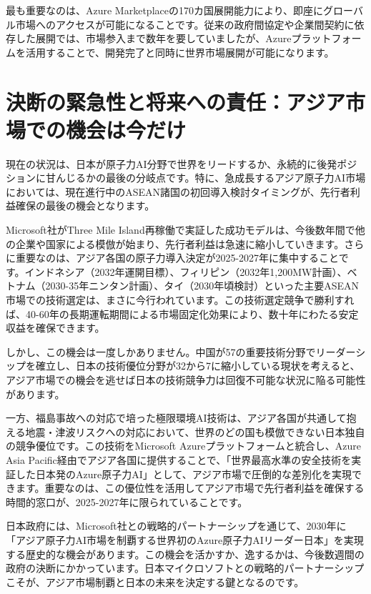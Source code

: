 \documentclass[10pt,a4paper]{jsarticle}
\begin{document}
最も重要なのは、Azure Marketplaceの170カ国展開能力により、即座にグローバル市場へのアクセスが可能になることです。従来の政府間協定や企業間契約に依存した展開では、市場参入まで数年を要していましたが、Azureプラットフォームを活用することで、開発完了と同時に世界市場展開が可能になります。

\section{決断の緊急性と将来への責任：アジア市場での機会は今だけ}

現在の状況は、日本が原子力AI分野で世界をリードするか、永続的に後発ポジションに甘んじるかの最後の分岐点です。特に、急成長するアジア原子力AI市場においては、現在進行中のASEAN諸国の初回導入検討タイミングが、先行者利益確保の最後の機会となります。

Microsoft社がThree Mile Island再稼働で実証した成功モデルは、今後数年間で他の企業や国家による模倣が始まり、先行者利益は急速に縮小していきます。さらに重要なのは、アジア各国の原子力導入決定が2025-2027年に集中することです。インドネシア（2032年運開目標）、フィリピン（2032年1,200MW計画）、ベトナム（2030-35年ニンタン計画）、タイ（2030年頃検討）といった主要ASEAN市場での技術選定は、まさに今行われています。この技術選定競争で勝利すれば、40-60年の長期運転期間による市場固定化効果により、数十年にわたる安定収益を確保できます。

しかし、この機会は一度しかありません。中国が57の重要技術分野でリーダーシップを確立し、日本の技術優位分野が32から7に縮小している現状を考えると、アジア市場での機会を逃せば日本の技術競争力は回復不可能な状況に陥る可能性があります。

一方、福島事故への対応で培った極限環境AI技術は、アジア各国が共通して抱える地震・津波リスクへの対応において、世界のどの国も模倣できない日本独自の競争優位です。この技術をMicrosoft Azureプラットフォームと統合し、Azure Asia Pacific経由でアジア各国に提供することで、「世界最高水準の安全技術を実証した日本発のAzure原子力AI」として、アジア市場で圧倒的な差別化を実現できます。重要なのは、この優位性を活用してアジア市場で先行者利益を確保する時間的窓口が、2025-2027年に限られていることです。

日本政府には、Microsoft社との戦略的パートナーシップを通じて、2030年に「アジア原子力AI市場を制覇する世界初のAzure原子力AIリーダー日本」を実現する歴史的な機会があります。この機会を活かすか、逸するかは、今後数週間の政府の決断にかかっています。日本マイクロソフトとの戦略的パートナーシップこそが、アジア市場制覇と日本の未来を決定する鍵となるのです。
\end{document}
